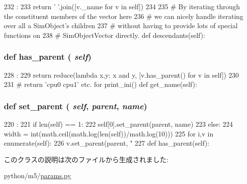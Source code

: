 \begin{DoxyCode}
232                       :
233         return ' '.join([v._name for v in self])
234 
235     # By iterating through the constituent members of the vector here
236     # we can nicely handle iterating over all a SimObject's children
237     # without having to provide lots of special functions on
238     # SimObjectVector directly.
    def descendants(self):
\end{DoxyCode}
\hypertarget{classm5_1_1params_1_1SimObjectVector_a71e011e66af177233516716c34212661}{
\subsubsection[{has\_\-parent}]{\setlength{\rightskip}{0pt plus 5cm}def has\_\-parent ( {\em self})}}
\label{classm5_1_1params_1_1SimObjectVector_a71e011e66af177233516716c34212661}



\begin{DoxyCode}
228                         :
229         return reduce(lambda x,y: x and y, [v.has_parent() for v in self])
230 
231     # return 'cpu0 cpu1' etc. for print_ini()
    def get_name(self):
\end{DoxyCode}
\hypertarget{classm5_1_1params_1_1SimObjectVector_a625d1d3f49ccb2ff8aacebe992396065}{
\subsubsection[{set\_\-parent}]{\setlength{\rightskip}{0pt plus 5cm}def set\_\-parent ( {\em self}, \/   {\em parent}, \/   {\em name})}}
\label{classm5_1_1params_1_1SimObjectVector_a625d1d3f49ccb2ff8aacebe992396065}



\begin{DoxyCode}
220                                       :
221         if len(self) == 1:
222             self[0].set_parent(parent, name)
223         else:
224             width = int(math.ceil(math.log(len(self))/math.log(10)))
225             for i,v in enumerate(self):
226                 v.set_parent(parent, "%
227 
    def has_parent(self):
\end{DoxyCode}


このクラスの説明は次のファイルから生成されました:\begin{DoxyCompactItemize}
\item 
python/m5/\hyperlink{params_8py}{params.py}\end{DoxyCompactItemize}

